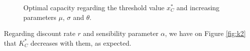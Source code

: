 \begin{figure}[!htb]
	\begin{subfigmatrix}{3}
	\end{subfigmatrix}
	\caption{Optimal capacity regarding the threshold value $x^*_C$ and increasing parameters $\mu$, $\sigma$ and $\theta$.}
	\label{fig:k1}
\end{figure}

Regarding discount rate $r$ and sensibility parameter $\alpha$, we have on Figure \ref{fig:k2} that $K^*_C$ decreases with them, as expected.
 
